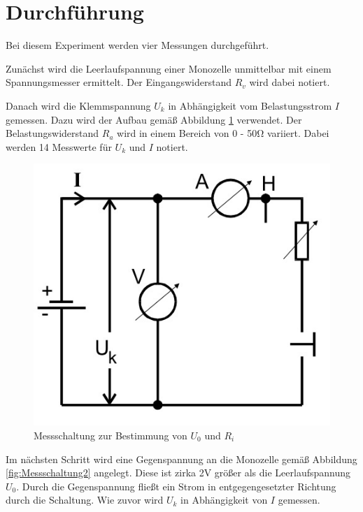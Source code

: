 \section{Durchführung}
Bei diesem Experiment werden vier Messungen durchgeführt. 

Zunächst wird die Leerlaufspannung einer Monozelle unmittelbar mit
einem Spannungsmesser ermittelt. Der Eingangswiderstand $R_v$ wird 
dabei notiert. 

Danach wird die Klemmspannung $U_k$ in Abhängigkeit vom Belastungsstrom
$I$ gemessen. Dazu wird der Aufbau gemäß Abbildung \ref{fig:Messschaltung} verwendet. Der 
Belastungswiderstand $R_a$ wird in einem Bereich von 0 - 50\si{\ohm} 
variiert. Dabei werden 14 Messwerte für $U_k$ und $I$ notiert.

\begin{figure}[H]
\center
\includegraphics[scale=0.3]{Aufbau_b.jpg}
\caption{Messschaltung zur Bestimmung von $U_0$ und $R_i$}
\label{fig:Messschaltung}
\end{figure}

Im nächsten Schritt wird eine Gegenspannung an die Monozelle gemäß Abbildung
\ref{fig:Messschaltung2} angelegt. Diese ist zirka 2V größer als die Leerlaufspannung
$U_0$. Durch die Gegenspannung fließt ein Strom in entgegengesetzter Richtung durch die 
Schaltung. Wie zuvor wird $U_k$ in Abhängigkeit von $I$ gemessen. 

